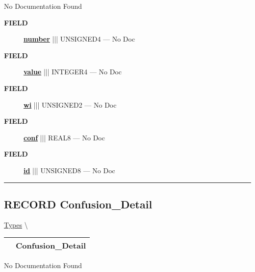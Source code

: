 \par





No Documentation Found







\par
\begin{description}
\item [\colorbox{tagtype}{\color{white} \textbf{\textsf{FIELD}}}] \textbf{\underline{number}} ||| UNSIGNED4 --- No Doc
\item [\colorbox{tagtype}{\color{white} \textbf{\textsf{FIELD}}}] \textbf{\underline{value}} ||| INTEGER4 --- No Doc
\item [\colorbox{tagtype}{\color{white} \textbf{\textsf{FIELD}}}] \textbf{\underline{wi}} ||| UNSIGNED2 --- No Doc
\item [\colorbox{tagtype}{\color{white} \textbf{\textsf{FIELD}}}] \textbf{\underline{conf}} ||| REAL8 --- No Doc
\item [\colorbox{tagtype}{\color{white} \textbf{\textsf{FIELD}}}] \textbf{\underline{id}} ||| UNSIGNED8 --- No Doc
\end{description}





\rule{\linewidth}{0.5pt}
\subsection*{\textsf{\colorbox{headtoc}{\color{white} RECORD}
Confusion\_Detail}}

\hypertarget{ecldoc:ml_core.types.confusion_detail}{}
\hspace{0pt} \hyperlink{ecldoc:ML_Core.Types}{Types} \textbackslash 

{\renewcommand{\arraystretch}{1.5}
\begin{tabularx}{\textwidth}{|>{\raggedright\arraybackslash}l|X|}
\hline
\hspace{0pt}\mytexttt{\color{red} } & \textbf{Confusion\_Detail} \\
\hline
\end{tabularx}
}

\par





No Documentation Found







